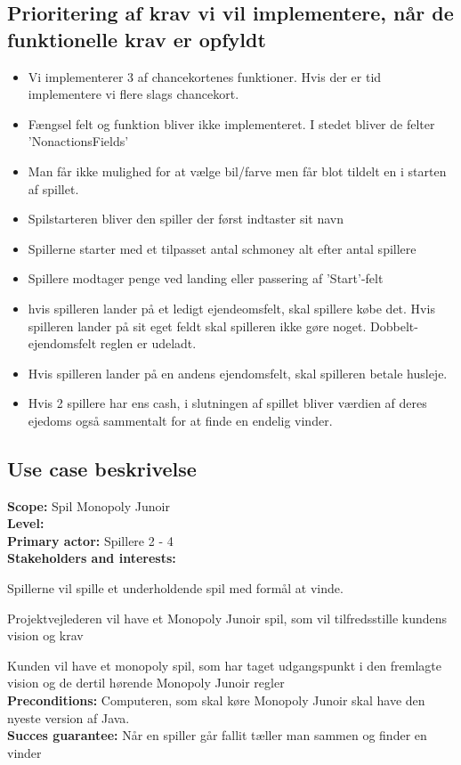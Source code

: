 \documentclass{article}
\begin{document}
\subsection{Prioritering af krav vi vil implementere, når de funktionelle krav er opfyldt}
\begin {itemize}
\item Vi implementerer 3 af chancekortenes funktioner. Hvis der er tid implementere vi flere slags chancekort.
\item Fængsel felt og funktion bliver ikke implementeret. I stedet bliver de felter 'NonactionsFields'
\item Man får ikke mulighed for at vælge bil/farve men får blot tildelt en i starten af spillet.
\item  Spilstarteren bliver  den spiller der først indtaster sit navn
\item Spillerne starter med et tilpasset antal schmoney alt efter antal spillere
\item Spillere modtager penge ved landing eller passering af 'Start'-felt
\item hvis spilleren lander på et ledigt ejendeomsfelt, skal spillere købe det. Hvis spilleren lander på sit eget feldt skal spilleren ikke gøre noget. Dobbelt-ejendomsfelt reglen er udeladt.
\item Hvis spilleren lander på en andens ejendomsfelt, skal spilleren betale husleje.
\item Hvis 2 spillere har ens cash, i slutningen af spillet bliver værdien af deres ejedoms også sammentalt for at finde en endelig vinder.
\end {itemize}
\subsection{Use case beskrivelse }
\textbf{Scope:} Spil Monopoly Junoir  
\\
\textbf{Level:}
\\
\textbf{Primary actor:} Spillere 2 - 4 
\\
\textbf{Stakeholders and interests:} 
\item Spillerne vil spille et underholdende spil med formål at vinde. 
\item Projektvejlederen vil have et Monopoly Junoir spil, som vil tilfredsstille kundens vision og krav
\item Kunden vil have et monopoly spil, som har taget udgangspunkt i den fremlagte vision og de dertil hørende Monopoly Junoir regler 
\\
\textbf{Preconditions:} Computeren, som skal køre Monopoly Junoir skal have den nyeste version af Java. 
\\
\textbf{Succes guarantee:} Når en spiller går fallit tæller man sammen og finder en vinder 
\end{document}
